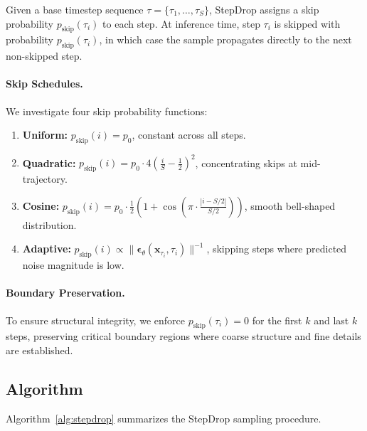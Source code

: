 \documentclass{article}
\begin{document}
Given a base timestep sequence $\tau = \{\tau_1, \ldots, \tau_S\}$, StepDrop assigns a skip probability $p_{\text{skip}}(\tau_i)$ to each step. At inference time, step $\tau_i$ is skipped with probability $p_{\text{skip}}(\tau_i)$, in which case the sample propagates directly to the next non-skipped step.

\paragraph{Skip Schedules.} We investigate four skip probability functions:

\begin{enumerate}
    \item \textbf{Uniform:} $p_{\text{skip}}(i) = p_0$, constant across all steps.
    
    \item \textbf{Quadratic:} $p_{\text{skip}}(i) = p_0 \cdot 4\left(\frac{i}{S} - \frac{1}{2}\right)^2$, concentrating skips at mid-trajectory.
    
    \item \textbf{Cosine:} $p_{\text{skip}}(i) = p_0 \cdot \frac{1}{2}\left(1 + \cos\left(\pi \cdot \frac{|i - S/2|}{S/2}\right)\right)$, smooth bell-shaped distribution.
    
    \item \textbf{Adaptive:} $p_{\text{skip}}(i) \propto \|\boldsymbol{\epsilon}_\theta(\mathbf{x}_{\tau_i}, \tau_i)\|^{-1}$, skipping steps where predicted noise magnitude is low.
\end{enumerate}

\paragraph{Boundary Preservation.} To ensure structural integrity, we enforce $p_{\text{skip}}(\tau_i) = 0$ for the first $k$ and last $k$ steps, preserving critical boundary regions where coarse structure and fine details are established.

\subsection{Algorithm}

Algorithm~\ref{alg:stepdrop} summarizes the StepDrop sampling procedure.
\end{document}
